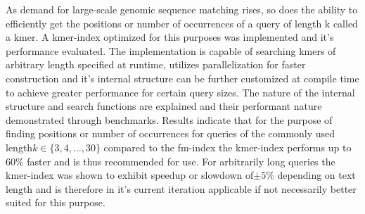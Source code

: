 \author{Clemens~Cords}
\newcommand{\matrikelno}{4872639}
\newcommand{\email}{clemens.cords@fu-berlin.de}

\newcommand{\supervisor}{Prof. Dr. Knut Reinert}
\newcommand{\supervisorUniversity}{Freie Universit\"at Berlin}
\newcommand{\supervisorDepartment}{Dept. of Computer Science and Mathematics}
\newcommand{\supervisorAG}{Algorithmische Bioinformatik}
\newcommand{\supervisorCountry}{Germany}

\newcommand{\fstAdvisor}{Enrico Seiler}
\newcommand{\fstAdvisorsUniversity}{Freie Universit\"at Berlin}
\newcommand{\fstAdvisorsDepartment}{Dept. of Computer Science and Mathematics}
\newcommand{\fstAdvisorsAG}{Algorithmische Bioinformatik}
\newcommand{\fstAdvisorsCountry}{Germany}

\newcommand{\sndAdvisor}{Prof. Dr. Knut Reinert}
\newcommand{\sndAdvisorsUniversity}{Freie Universit\"at Berlin} %
\newcommand{\sndAdvisorsCountry}{Germany}



\begin{abstractEN}
As demand for large-scale genomic sequence matching rises, so does
the ability to efficiently get the positions or number of occurrences
of a query of length k called a kmer. A kmer-index optimized for this
purposes was implemented and it's performance evaluated. The implementation
is capable of searching kmers of arbitrary length specified at runtime,
utilizes parallelization for faster construction and it's internal
structure can be further customized at compile time to achieve greater
performance for certain query sizes. The nature of the internal structure
and search functions are explained and their performant nature demonstrated
through benchmarks. Results indicate that for the purpose of finding
positions or number of occurrences for queries of the commonly used
length$k\in\{3,4,...,30\}$ compared to the fm-index the kmer-index
performs up to 60\% faster and is thus recommended for use. For arbitrarily
long queries the kmer-index was shown to exhibit speedup or slowdown
of$\pm5$\% depending on text length and is therefore in it's current
iteration applicable if not necessarily better suited for this purpose.
\end{abstractEN}
\vfill

